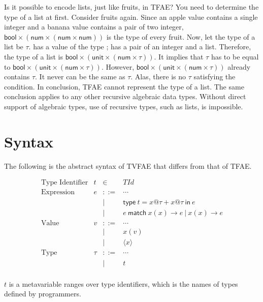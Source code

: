 Is it possible to encode lists, just like fruits, in TFAE? You need to determine
the type of a list at first. Consider fruits again. Since an apple value
contains a single integer and a banana value contains a pair of two integer,
$\textsf{bool}\times(\textsf{num}\times(\textsf{num}\times\textsf{num}))$ is the type of
every fruit. Now, let the type of a list be $\tau$.  has a value of the
type ;  has a pair of an integer and a list. Therefore, the
type of
a list is $\textsf{bool}\times(\textsf{unit}\times(\textsf{num}\times\tau))$. It
implies that $\tau$ has to be equal to \(\textsf{bool}\times(\textsf{
unit}\times(\textsf{num}\times\tau))\). However, \(\textsf{bool}\times(\textsf{
unit}\times(\textsf{num}\times\tau))\) already contains $\tau$. It never can be
the same as $\tau$. Alas, there is no $\tau$ satisfying the condition. In
conclusion, TFAE cannot represent the type of a list. The same conclusion
applies to any other recursive algebraic data types. Without direct support of
algebraic types, use of recursive types, such as lists, is impossible.

\section{Syntax}

The following is the abstract syntax of TVFAE that differs from that of TFAE.

\[
\begin{array}{rrcl}
\text{Type Identifier} & t & \in & \mathit{TId} \\
\text{Expression} & e & ::= & \cdots \\
&&|& \textsf{type}\ t=x@\tau+x@\tau\ \textsf{in}\ e \\
&&|& e\ \textsf{match}\ x(x)\rightarrow e\ |\ x(x)\rightarrow e \\
\text{Value} & v & ::= & \cdots \\
&&|& x(v) \\
&&|& \langle x\rangle \\
\text{Type} & \tau & ::= & \cdots \\
&&|& t \\
\end{array}
\]

$t$ is a metavariable ranges over type identifiers, which is the names of
types defined by programmers.

